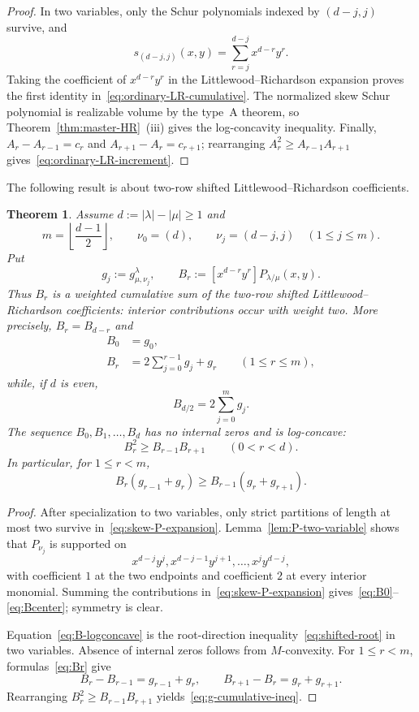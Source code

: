 \documentclass[11pt,a4paper,oneside]{amsart}
\numberwithin{equation}{section}
\newtheorem{theorem}{Theorem}[section]
\theoremstyle{definition}
\theoremstyle{remark}
\newcommand{\abs}[1]{\lvert#1\rvert}
\begin{document}
\begin{proof}
In two variables, only the Schur polynomials indexed by $(d-j,j)$ survive, and
\[
 s_{(d-j,j)}(x,y)=\sum_{r=j}^{d-j}x^{d-r}y^r.
\]
Taking the coefficient of $x^{d-r}y^r$ in the Littlewood--Richardson expansion proves the first identity in~\eqref{eq:ordinary-LR-cumulative}.  The normalized skew Schur polynomial is realizable volume by the type~A theorem, so Theorem~\ref{thm:master-HR}~\textup{(iii)} gives the log-concavity inequality.  Finally,
$A_r-A_{r-1}=c_r$ and $A_{r+1}-A_r=c_{r+1}$; rearranging
$A_r^2\geq A_{r-1}A_{r+1}$ gives~\eqref{eq:ordinary-LR-increment}.
\end{proof}

The following result is about two-row shifted Littlewood--Richardson coefficients.

\begin{theorem}\label{thm:shifted-LR-logconcavity}
Assume $d:=\abs\lambda-\abs\mu\geq1$ and
\[
 m=\left\lfloor\frac{d-1}{2}\right\rfloor,
 \qquad
 \nu_0=(d),
 \qquad
 \nu_j=(d-j,j)\quad(1\leq j\leq m).
\]
Put
\[
 g_j:=g_{\mu,\nu_j}^{\lambda},
 \qquad
 B_r:=[x^{d-r}y^r]P_{\lambda/\mu}(x,y).
\]
Thus $B_r$ is a weighted cumulative sum of the two-row shifted Littlewood--Richardson coefficients: interior contributions occur with weight two.  More precisely, $B_r=B_{d-r}$ and
\begin{align}
 B_0&=g_0,
 \label{eq:B0}\\
 B_r&=2\sum_{j=0}^{r-1}g_j+g_r
 \qquad(1\leq r\leq m),
 \label{eq:Br}\end{align}
while, if $d$ is even,
\begin{equation}\label{eq:Bcenter}
 B_{d/2}=2\sum_{j=0}^{m}g_j.
\end{equation}
The sequence $B_0,B_1,\ldots,B_d$ has no internal zeros and is log-concave:
\begin{equation}\label{eq:B-logconcave}
 B_r^2\geq B_{r-1}B_{r+1}\qquad(0<r<d).
\end{equation}
In particular, for $1\leq r<m$,
\begin{equation}\label{eq:g-cumulative-ineq}
 B_r(g_{r-1}+g_r)
 \geq
 B_{r-1}(g_r+g_{r+1}).
\end{equation}
\end{theorem}

\begin{proof}
After specialization to two variables, only strict partitions of length at most two survive in~\eqref{eq:skew-P-expansion}.  Lemma~\ref{lem:P-two-variable} shows that $P_{\nu_j}$ is supported on
\[
 x^{d-j}y^j, x^{d-j-1}y^{j+1},\ldots, x^j y^{d-j},
\]
with coefficient $1$ at the two endpoints and coefficient $2$ at every interior monomial.  Summing the contributions in~\eqref{eq:skew-P-expansion} gives~\eqref{eq:B0}--\eqref{eq:Bcenter}; symmetry is clear.

Equation~\eqref{eq:B-logconcave} is the root-direction inequality~\eqref{eq:shifted-root} in two variables.  Absence of internal zeros follows from $M$-convexity.  For $1\leq r<m$, formulas~\eqref{eq:Br} give
\[
 B_r-B_{r-1}=g_{r-1}+g_r,
 \qquad
 B_{r+1}-B_r=g_r+g_{r+1}.
\]
Rearranging $B_r^2\geq B_{r-1}B_{r+1}$ yields~\eqref{eq:g-cumulative-ineq}.
\end{proof}
\end{document}
